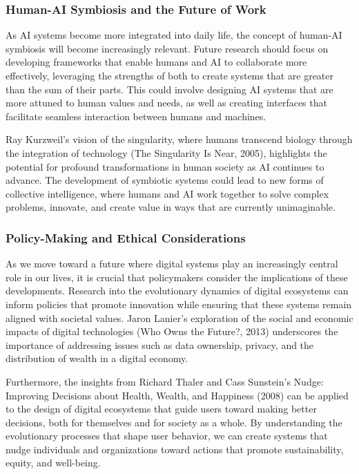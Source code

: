 \documentclass[12pt,twoside]{article}
\begin{document}
\subsubsection{ Human-AI Symbiosis and the Future of Work}

As AI systems become more integrated into daily life, the concept of human-AI symbiosis will become increasingly relevant. Future research should focus on developing frameworks that enable humans and AI to collaborate more effectively, leveraging the strengths of both to create systems that are greater than the sum of their parts. This could involve designing AI systems that are more attuned to human values and needs, as well as creating interfaces that facilitate seamless interaction between humans and machines.

Ray Kurzweil's vision of the singularity, where humans transcend biology through the integration of technology (The Singularity Is Near, 2005), highlights the potential for profound transformations in human society as AI continues to advance. The development of symbiotic systems could lead to new forms of collective intelligence, where humans and AI work together to solve complex problems, innovate, and create value in ways that are currently unimaginable.


\subsubsection{Policy-Making and Ethical Considerations}

As we move toward a future where digital systems play an increasingly central role in our lives, it is crucial that policymakers consider the implications of these developments. Research into the evolutionary dynamics of digital ecosystems can inform policies that promote innovation while ensuring that these systems remain aligned with societal values. Jaron Lanier's exploration of the social and economic impacts of digital technologies (Who Owns the Future?, 2013) underscores the importance of addressing issues such as data ownership, privacy, and the distribution of wealth in a digital economy.

Furthermore, the insights from Richard Thaler and Cass Sunstein's Nudge: Improving Decisions about Health, Wealth, and Happiness (2008) can be applied to the design of digital ecosystems that guide users toward making better decisions, both for themselves and for society as a whole. By understanding the evolutionary processes that shape user behavior, we can create systems that nudge individuals and organizations toward actions that promote sustainability, equity, and well-being.
\end{document}
